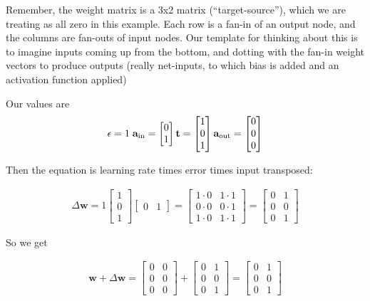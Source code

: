 Remember, the weight matrix is a 3x2 matrix  (``target-source''), which we are treating as all zero in this example. Each row is a fan-in of an output node, and the columns are fan-outs of input nodes. Our template for thinking about this is to imagine inputs coming up from the bottom, and dotting with the fan-in weight vectors to produce outputs (really net-inputs, to which bias is added and an activation function applied)

Our values are
\begin{equation*}
\epsilon = 1 \; \; \\
\mathbf{a}_{\text{in}} = \begin{bmatrix} 0 \\ 1 \end{bmatrix} \\
\mathbf{t} = \begin{bmatrix} 1 \\ 0 \\ 1 \end{bmatrix}
\mathbf{a}_{\text{out}} = \begin{bmatrix} 0 \\ 0 \\ 0 \end{bmatrix}
\end{equation*}

Then the equation is learning rate times error times input transposed:

\begin{align*}
\Delta \mathbf{w}  = 1
\begin{bmatrix} 1 \\ 0 \\ 1 \end{bmatrix} 
\begin{bmatrix} 0 & 1 \end{bmatrix} 
= \begin{bmatrix} 1 \cdot 0 & 1 \cdot 1 \\ 0 \cdot 0 & 0 \cdot 1 \\ 1 \cdot 0 & 1 \cdot 1 \end{bmatrix} 
= \begin{bmatrix} 0 & 1 \\ 0 & 0 \\  0 & 1  \end{bmatrix}
\end{align*}

So we get

\begin{align*}
\mathbf{w} + \Delta \mathbf{w}  =
\begin{bmatrix} 0 & 0 \\ 0 & 0 \\  0  & 0  \end{bmatrix} +
\begin{bmatrix} 0 & 1 \\ 0 & 0 \\  0  & 1  \end{bmatrix} =
\begin{bmatrix} 0 & 1 \\ 0 & 0 \\  0  & 1  \end{bmatrix}
\end{align*}

